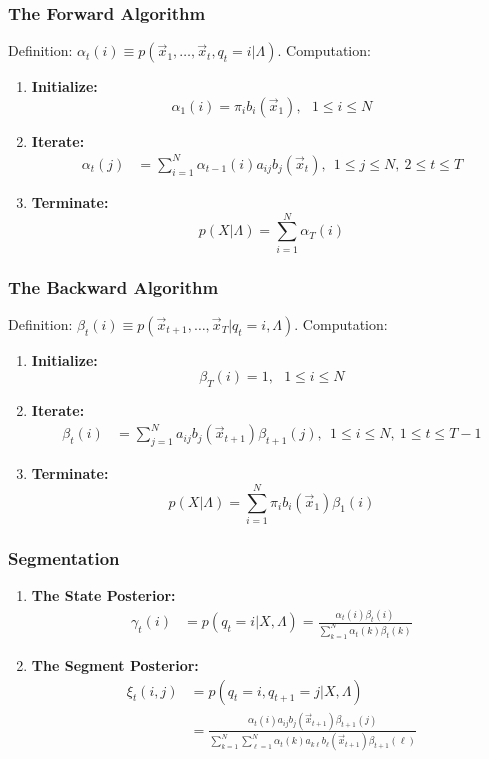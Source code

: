 \documentclass{beamer}
\begin{document}
\begin{frame}
  \frametitle{The Forward Algorithm}

  Definition: $\alpha_t(i) \equiv p(\vec{x}_1,\ldots,\vec{x}_t,q_t=i|\Lambda)$.  Computation:
  \begin{enumerate}
  \item {\bf Initialize:}
    \[
    \alpha_1(i) = \pi_i b_i(\vec{x}_1),~~~1\le i\le N
    \]
  \item {\bf Iterate:}
    \begin{align*}
      \alpha_{t}(j) &= \sum_{i=1}^N \alpha_{t-1}(i) a_{ij}b_j(\vec{x}_t),~~1\le j\le N,~2\le t\le T
    \end{align*}
  \item {\bf Terminate:}
    \[
    p(X|\Lambda) = \sum_{i=1}^N \alpha_T(i)
    \]
  \end{enumerate}
\end{frame}
  
\begin{frame}
  \frametitle{The Backward Algorithm}

  Definition: $\beta_t(i) \equiv p(\vec{x}_{t+1},\ldots,\vec{x}_T|q_t=i,\Lambda)$.  Computation:
  \begin{enumerate}
  \item {\bf Initialize:}
    \[
    \beta_T(i) = 1,~~~1\le i\le N
    \]
  \item {\bf Iterate:}
    \begin{align*}
      \beta_{t}(i) &= \sum_{j=1}^N a_{ij}b_j(\vec{x}_{t+1})\beta_{t+1}(j),~~1\le i\le N,~1\le t\le T-1
    \end{align*}
  \item {\bf Terminate:}
    \[
    p(X|\Lambda) = \sum_{i=1}^N \pi_ib_i(\vec{x}_1)\beta_1(i)
    \]
  \end{enumerate}
\end{frame}

\begin{frame}
  \frametitle{Segmentation}

  \begin{enumerate}
  \item {\bf The State Posterior:}
    \begin{align*}
      \gamma_t(i) & = p(q_t=i|X,\Lambda)
      = \frac{\alpha_t(i)\beta_t(i)}{\sum_{k=1}^N\alpha_t(k)\beta_t(k)}
    \end{align*}
  \item {\bf The Segment Posterior:}
    \begin{align*}
      \xi_t(i,j) & = p(q_t=i,q_{t+1}=j|X,\Lambda)\\
      &= \frac{\alpha_t(i)a_{ij}b_j(\vec{x}_{t+1})\beta_{t+1}(j)}{\sum_{k=1}^N\sum_{\ell=1}^N\alpha_t(k)a_{k\ell}b_\ell(\vec{x}_{t+1})\beta_{t+1}(\ell)}
    \end{align*}
  \end{enumerate}
\end{frame}
\end{document}
